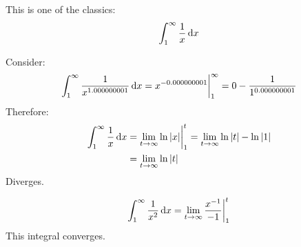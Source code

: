 \begin{ex}
  This is one of the classics:
	\[ \int^\infty_1 \frac{1}{x}\,\mathrm{d} x \]
	\begin{sol}
	  Consider:
    \[ \int^\infty_1 \frac{1}{x^{1.000000001}}\,\mathrm{d} x = x^{-0.000000001}\bigg|^\infty_1=0-\frac{1}{1^{0.000000001}}\]
    Therefore:
	  \begin{align*}
	  	\int^\infty_1 \frac{1}{x}\,\mathrm{d} x
	  	&=\lim_{t \to \infty} \ln{|x|}\bigg|^t_1=\lim_{t \to \infty} \ln{|t|}-\ln{|1|} \\
	  	& =\lim_{t \to \infty} \ln{|t|}
	  \end{align*}
	  Diverges.
  \end{sol}
\end{ex}
\begin{ex}
  \[ \int^\infty_1 \frac{1}{x^2}\,\mathrm{d} x =\lim_{t\to\infty}
    \frac{x^{-1}}{-1}\bigg|^t_1 \]
  This integral converges.
\end{ex}

